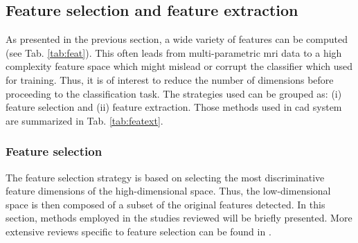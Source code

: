 \subsection{Feature selection and feature extraction} \label{subsec:featureselectionextraction}

As presented in the previous section, a wide variety of features can be computed (see Tab. \ref{tab:feat}). This often leads from multi-parametric \ac{mri} data to a high complexity feature space which might mislead or corrupt the classifier which used for training. Thus, it is of interest to reduce the number of dimensions before proceeding to the classification task. The strategies used can be grouped as: (i) feature selection and (ii) feature extraction. Those methods used in \ac{cad} system are summarized in Tab. \ref{tab:featext}.

\subsubsection{Feature selection}\label{subsubsec:featsel}

The feature selection strategy is based on selecting the most discriminative feature dimensions of the high-dimensional space. Thus, the low-dimensional space is then composed of a subset of the original features detected. In this section, methods employed in the studies reviewed will be briefly presented. More extensive reviews specific to feature selection can be found in \cite{Saeys2007}.

